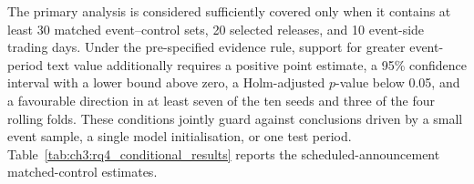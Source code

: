 The primary analysis is considered sufficiently covered only when it contains
at least 30 matched event--control sets, 20 selected releases, and 10
event-side trading days.  Under the pre-specified evidence rule, support for
greater event-period text value additionally requires a positive point estimate, a
95\% confidence interval with a lower bound above zero, a Holm-adjusted
$p$-value below 0.05, and a favourable direction in at least seven of the ten
seeds and three of the four rolling folds.  These conditions jointly guard
against conclusions driven by a small event sample, a single model
initialisation, or one test period.  Table~\ref{tab:ch3:rq4_conditional_results}
reports the scheduled-announcement matched-control estimates.

\begin{table}[htbp]
\centering
\scriptsize
\setlength{\tabcolsep}{3pt}

\end{table}
